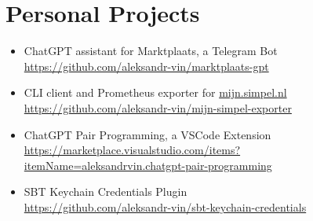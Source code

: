\section*{Personal Projects}

\begin{itemize}[noitemsep, nosep]
  \item ChatGPT assistant for Marktplaats, a Telegram Bot \\
  \href{https://github.com/aleksandr-vin/marktplaats-gpt}{\url{https://github.com/aleksandr-vin/marktplaats-gpt}}
  \item CLI client and Prometheus exporter for \url{mijn.simpel.nl} \\
  \href{https://github.com/aleksandr-vin/mijn-simpel-exporter}{\url{https://github.com/aleksandr-vin/mijn-simpel-exporter}}
  \item ChatGPT Pair Programming, a VSCode Extension \\
  \href{https://marketplace.visualstudio.com/items?itemName=aleksandrvin.chatgpt-pair-programming}{\url{https://marketplace.visualstudio.com/items?itemName=aleksandrvin.chatgpt-pair-programming}}
  \item SBT Keychain Credentials Plugin \\
  \href{https://github.com/aleksandr-vin/sbt-keychain-credentials}{\url{https://github.com/aleksandr-vin/sbt-keychain-credentials}}
\end{itemize}
